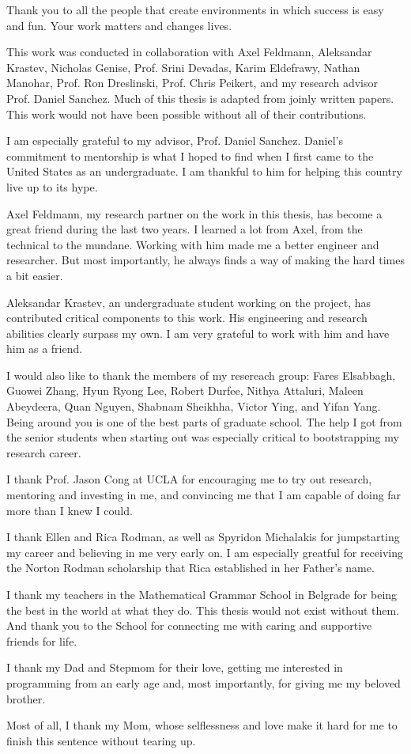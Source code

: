 Thank you to all the people that create environments in which success is easy
and fun. Your work matters and changes lives.

This work was conducted in collaboration with Axel Feldmann, Aleksandar
Krastev, Nicholas Genise, Prof. Srini Devadas, Karim Eldefrawy, Nathan Manohar,
Prof. Ron Dreslinski, Prof. Chris Peikert, and my research advisor Prof. Daniel
Sanchez. Much of this thesis is adapted from joinly written papers. This work
would not have been possible without all of their contributions.

I am especially grateful to my advisor, Prof. Daniel Sanchez. Daniel's
commitment to mentorship is what I hoped to find when I first came to the
United States as an undergraduate. I am thankful to him for helping this
country live up to its hype.

Axel Feldmann, my research partner on the work in this thesis, has become a
great friend during the last two years. I learned a lot from Axel, from the
technical to the mundane. Working with him made me a better engineer and
researcher. But most importantly, he always finds a way of making the hard
times a bit easier.

Aleksandar Krastev, an undergraduate student working on the project, has
contributed critical components to this work. His engineering and research
abilities clearly surpass my own. I am very grateful to work with him and have
him as a friend.

I would also like to thank the members of my resereach group: Fares Elsabbagh,
Guowei Zhang, Hyun Ryong Lee, Robert Durfee, Nithya Attaluri, Maleen Abeydeera,
Quan Nguyen, Shabnam Sheikhha, Victor Ying, and Yifan Yang. Being around you is
one of the best parts of graduate school. The help I got from the senior
students when starting out was especially critical to bootstrapping my
research career.

I thank Prof. Jason Cong at UCLA for encouraging me to try out research,
mentoring and investing in me, and convincing me that I am capable of doing far
more than I knew I could.

I thank Ellen and Rica Rodman, as well as Spyridon Michalakis for jumpstarting
my career and believing in me very early on. I am especially greatful for
receiving the Norton Rodman scholarship that Rica established in her Father's
name.

I thank my teachers in the Mathematical Grammar School in Belgrade for being
the best in the world at what they do. This thesis would not exist without
them. And thank you to the School for connecting me with caring and supportive
friends for life.

I thank my Dad and Stepmom for their love, getting me interested in programming
from an early age and, most importantly, for giving me my beloved brother.

Most of all, I thank my Mom, whose selflessness and love make it hard for me to
finish this sentence without tearing up.
